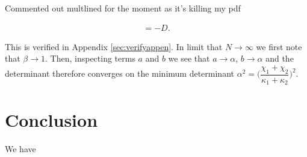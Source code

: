 \documentclass[11pt,a4paper]{article}
\numberwithin{equation}{section}
\begin{document}
	
	Commented out multlined for the moment as it's killing my pdf 
	\iffalse
	\[
	\begin{multlined}
	= \left(\begin{matrix}
	-\kappa_1 a - 2Nc & 0 \\
	0 & -\kappa_1 a - 2Nc \\ 
	0 & -\frac{1}{2}(\kappa_1 + \kappa_2)c - N(b-a)	\\ 
	\frac{1}{2}(\kappa_1 + \kappa_2)c - N(b-a) & 0 \\ 
	\end{matrix}\right. \quad\dotsm  \\
	\dotsm\quad\left.\begin{matrix}
	0 & \frac{1}{2}(\kappa_1 + \kappa_2)c - N(b-a)     \\
	-\frac{1}{2}(\kappa_1 + \kappa_2)c - N(b-a) & 0     \\
	-\kappa_2 b + 2Nc & 0     \\
	0 & -\kappa_2 b + 2Nc		\\
	\end{matrix}\right)
	\end{multlined}
	\]   
	\fi
	
	\begin{align*}
	&= -D.&	
	\end{align*}
	
	This is verified in Appendix \ref{sec:verifyappen}. In limit that $N \rightarrow \infty$ we first note that $\beta \rightarrow 1$. Then, inspecting terms $a$ and $b$ we see that $a \rightarrow \alpha$, $b \rightarrow \alpha$ and the determinant therefore converges on the minimum determinant $\alpha^2=\Big(\dfrac{\chi_1 + \chi_2}{\kappa_1 + \kappa_2}\Big)^2$.
	
	
	\section{Conclusion}
	\label{sec:conc}
	
	We have 
\end{document}
